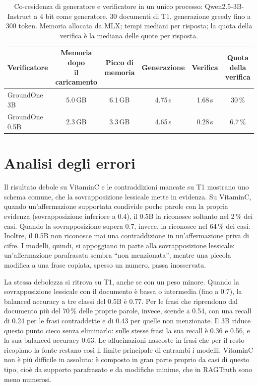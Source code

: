 \begin{table}[htbp]
\centering
\caption{Co-residenza di generatore e verificatore in un unico processo: Qwen2.5-3B-Instruct a 4 bit come generatore,
30 documenti di T1, generazione greedy fino a 300 token. Memoria allocata da MLX; tempi mediani per risposta; la quota della verifica è la mediana delle quote per risposta.}
\label{tab:results-coresidence}
\small
\begin{tabular}{lccccc}
\toprule
Verificatore & \makecell{Memoria dopo\\il caricamento} & \makecell{Picco di\\memoria} & Generazione & Verifica & \makecell{Quota della\\verifica} \\
\midrule
GroundOne 3B & 5.0\,GB & 6.1\,GB & 4.75\,s & 1.68\,s & 30\,\% \\
GroundOne 0.5B & 2.3\,GB & 3.3\,GB & 4.65\,s & 0.28\,s & 6.7\,\% \\
\bottomrule
\end{tabular}
\end{table}

\section{Analisi degli errori}
\label{sec:results-errors}

Il risultato debole su VitaminC e le contraddizioni mancate su T1 mostrano uno schema comune, che la sovrapposizione lessicale mette in evidenza. Su VitaminC, quando un'affermazione supportata condivide poche parole con la propria
evidenza (sovrapposizione inferiore a 0.4), il 0.5B la riconosce soltanto nel 2\,\% dei casi. Quando la sovrapposizione
supera 0.7, invece, la riconosce nel 64\,\% dei casi. Inoltre, il 0.5B non riconosce mai una contraddizione in
un'affermazione priva di cifre. I modelli, quindi, si appoggiano in parte alla sovrapposizione lessicale: un'affermazione
parafrasata sembra ``non menzionata'', mentre una piccola modifica a una frase copiata, spesso un numero, passa
inosservata.

La stessa debolezza si ritrova su T1, anche se con un peso minore. Quando la sovrapposizione lessicale con il documento è bassa o intermedia (fino a 0.7), la balanced accuracy a tre classi del 0.5B è 0.77. Per le frasi che riprendono dal documento più del
70\,\% delle proprie parole, invece, scende a 0.54, con una recall di 0.24 per le frasi contraddette e di 0.43 per quelle
non menzionate. Il 3B riduce questo punto cieco senza eliminarlo: sulle stesse frasi la sua recall è 0.36 e 0.56, e la
sua balanced accuracy 0.63. Le allucinazioni nascoste in frasi che per il resto ricopiano la fonte restano così il limite
principale di entrambi i modelli. VitaminC non è più difficile in assoluto: è composto in gran parte proprio da casi di
questo tipo, cioè da supporto parafrasato e da modifiche minime, che in RAGTruth sono meno numerosi.


